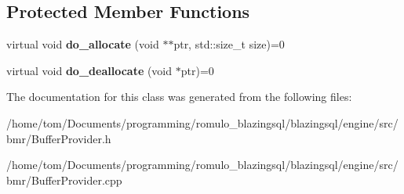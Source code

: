 \subsection*{Protected Member Functions}
\begin{DoxyCompactItemize}
\item 
\mbox{\label{classral_1_1memory_1_1base__allocator_ad6b8fa2aae326028c98fc36342b06ddc}} 
virtual void {\bfseries do\+\_\+allocate} (void $\ast$$\ast$ptr, std\+::size\+\_\+t size)=0
\item 
\mbox{\label{classral_1_1memory_1_1base__allocator_a934af0fdfb53ac5912e29e355580c703}} 
virtual void {\bfseries do\+\_\+deallocate} (void $\ast$ptr)=0
\end{DoxyCompactItemize}


The documentation for this class was generated from the following files\+:\begin{DoxyCompactItemize}
\item 
/home/tom/\+Documents/programming/romulo\+\_\+blazingsql/blazingsql/engine/src/bmr/Buffer\+Provider.\+h\item 
/home/tom/\+Documents/programming/romulo\+\_\+blazingsql/blazingsql/engine/src/bmr/Buffer\+Provider.\+cpp\end{DoxyCompactItemize}
